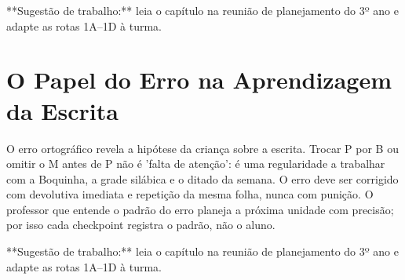 \begin{dica}
**Sugestão de trabalho:** leia o capítulo na reunião de planejamento do 3º ano e adapte as rotas 1A–1D à turma.
\end{dica}

\chapter{O Papel do Erro na Aprendizagem da Escrita}

O erro ortográfico revela a hipótese da criança sobre a escrita. Trocar P por B ou omitir o M antes de P não é 'falta de atenção': é uma regularidade a trabalhar com a Boquinha, a grade silábica e o ditado da semana. O erro deve ser corrigido com devolutiva imediata e repetição da mesma folha, nunca com punição. O professor que entende o padrão do erro planeja a próxima unidade com precisão; por isso cada checkpoint registra o padrão, não o aluno.


\begin{dica}
**Sugestão de trabalho:** leia o capítulo na reunião de planejamento do 3º ano e adapte as rotas 1A–1D à turma.
\end{dica}
